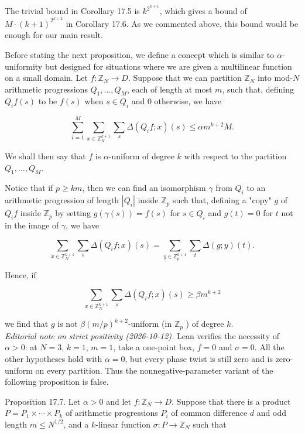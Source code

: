 \documentclass[10pt]{article}
\begin{document}
The trivial bound in Corollary 17.5 is $k^{2^{k+1}}$, which gives a bound of $M \cdot (k+1)^{2^{k+2}}$ in Corollary 17.6. As we commented above, this bound would be enough for our main result.

Before stating the next proposition, we define a concept which is similar to $\alpha$-uniformity but designed for situations where we are given a multilinear function on a small domain. Let $f: \mathbb{Z}_{N} \rightarrow D$. Suppose that we can partition $\mathbb{Z}_{N}$ into mod-$N$ arithmetic progressions $Q_{1}, \ldots, Q_{M}$, each of length at most $m$, such that, defining $Q_{i} f(s)$ to be $f(s)$ when $s \in Q_{i}$ and 0 otherwise, we have

$$
\sum_{i=1}^{M} \sum_{x \in \mathbb{Z}_{N}^{k+1}} \sum_{s} \Delta\left(Q_{i} f ; x\right)(s) \leqslant \alpha m^{k+2} M .
$$

We shall then say that $f$ is $\alpha$-uniform of degree $k$ with respect to the partition $Q_{1}, \ldots, Q_{M}$.

Notice that if $p \geqslant k m$, then we can find an isomorphism $\gamma$ from $Q_{i}$ to an arithmetic progression of length $\left|Q_{i}\right|$ inside $\mathbb{Z}_{p}$ such that, defining a "copy" $g$ of $Q_{i} f$ inside $\mathbb{Z}_{p}$ by setting $g(\gamma(s))=f(s)$ for $s \in Q_{i}$ and $g(t)=0$ for $t$ not in the image of $\gamma$, we have

$$
\sum_{x \in \mathbb{Z}_{N}^{k+1}} \sum_{s} \Delta\left(Q_{i} f ; x\right)(s)=\sum_{y \in \mathbb{Z}_{p}^{k+1}} \sum_{t} \Delta(g ; y)(t) .
$$

Hence, if

$$
\sum_{x \in \mathbb{Z}_{N}^{k+1}} \sum_{s} \Delta\left(Q_{i} f ; x\right)(s) \geqslant \beta m^{k+2}
$$

we find that $g$ is not $\beta(m / p)^{k+2}$-uniform (in $\mathbb{Z}_{p}$ ) of degree $k$.\\
\emph{Editorial note on strict positivity (2026-10-12).}
Lean verifies the necessity of $\alpha>0$: at $N=3$, $k=1$, $m=1$,
take a one-point box, $f=0$ and $\sigma=0$. All the other hypotheses
hold with $\alpha=0$, but every phase twist is still zero and is
zero-uniform on every partition. Thus the nonnegative-parameter
variant of the following proposition is false.

Proposition 17.7. Let $\alpha>0$ and let $f: \mathbb{Z}_{N} \rightarrow D$. Suppose that there is a product $P=P_{1} \times \cdots \times P_{k}$ of arithmetic progressions $P_{i}$ of common difference $d$ and odd length $m \leqslant N^{1 / 2}$, and a $k$-linear function $\sigma: P \rightarrow \mathbb{Z}_{N}$ such that
\end{document}
